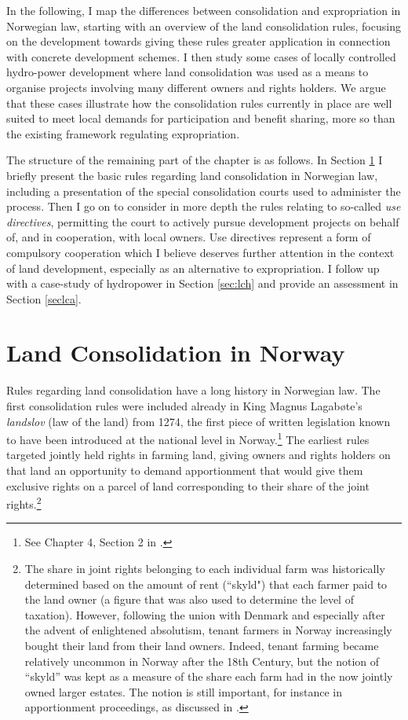 {In the following, I map the differences between consolidation and expropriation in Norwegian law, starting with an overview of the land consolidation rules, focusing on the development towards giving these rules greater application in connection with concrete development schemes. I then study some cases of locally controlled hydro-power development where land consolidation was used as a means to organise projects involving many different owners and rights holders. We argue that these cases illustrate how the consolidation rules currently in place are well suited to meet local demands for participation and benefit sharing, more so than the existing framework regulating expropriation.

The structure of the remaining part of the chapter is as follows. In Section \ref{sec:lcc} I briefly present the basic rules regarding land consolidation in Norwegian law, including a presentation of the special consolidation courts used to administer the process. Then I go on to consider in more depth the rules relating to so-called \emph{use directives}, permitting the court to actively pursue development projects on behalf of, and in cooperation, with local owners. Use directives represent a form of compulsory cooperation which I believe deserves further attention in the context of land development, especially as an alternative to expropriation. I follow up with a case-study of hydropower in Section \ref{sec:lch} and provide an assessment in Section \ref{seclca}. }

\section{Land Consolidation in Norway}\label{sec:lcc}

Rules regarding land consolidation have a long history in Norwegian law. The first consolidation rules were included already in King Magnus Lagabøte's \emph{landslov} (law of the land) from 1274, the first piece of written legislation known to have been introduced at the national level in Norway.\footnote{See Chapter 4, Section 2 in \cite{nou02}.} The earliest rules targeted jointly held rights in farming land, giving owners and rights holders on that land an opportunity to demand apportionment that would give them exclusive rights on a parcel of land corresponding to their share of the joint rights.\footnote{The share in joint rights belonging to each individual farm was historically determined based on the amount of rent (``skyld") that each farmer paid to the land owner (a figure that was also used to determine the level of taxation). However, following the union with Denmark and especially after the advent of enlightened absolutism, tenant farmers in Norway increasingly bought their land from their land owners.  Indeed, tenant farming became relatively uncommon in Norway after the 18th Century, but the notion of ``skyld'' was kept as a measure of the share each farm had in the now jointly owned larger estates. The notion is still important, for instance in apportionment proceedings, as discussed in \cite{ravna09a}.}

